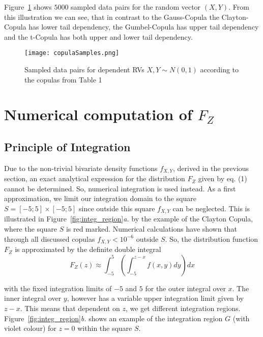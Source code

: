 \documentclass[a4paper]{article}
\begin{document}
Figure~\ref{fig:copulaSample} shows $5000$ sampled data pairs for the random vector $(X,Y)$. From this illustration we can see, that in contrast to the Gauss-Copula the Clayton-Copula has lower tail dependency, the Gumbel-Copula has upper tail dependency and the t-Copula has both upper and lower tail dependency.

\begin{figure}[h]
	\texttt{[image: copulaSamples.png]}  %
	\caption{\small Sampled data pairs for dependent RVs $X, Y \sim N(0,1)$ according to the copulas from Table 1}
	\label{fig:copulaSample}       
\end{figure}





\section{Numerical computation of $F_Z$}

\subsection{Principle of Integration}

Due to the non-trivial bivariate density functions $f_{X,Y}$, derived in the previous section, an exact analytical expression for the distribution $F_Z$ given by eq. (1) cannot be determined.  So, numerical integration is used instead. As a first approximation, we limit our integration domain to the square $S= [-5;5] \times [-5;5]$ since outside this square $f_{X,Y}$ can be neglected. This is illustrated in Figure~\ref{fig:integ_region}{\it a.} by the example of the Clayton Copula, where the square $S$ is red marked. Numerical calculations have shown that through all discussed copulas $f_{X,Y} < 10^{-6}$ outside $S$. 
So, the distribution function $F_Z$ is approximated by the definite double integral
\begin{equation}
	F_Z(z) \approx \int_{-5}^{5}\left(\int_{-5}^{z-x}f(x,y)dy\right)dx
\end{equation}

with the fixed integration limits of $-5$ and $5$ for the outer integral over $x$.
The inner integral over $y$, however has a variable upper integration limit given by $z-x$. This means that dependent on $z$, we get different integration regions. Figure~\ref{fig:integ_region}{\it b.} shows an example of the integration region $G$ (with violet colour) for $z=0$ within the square $S$.
\end{document}
